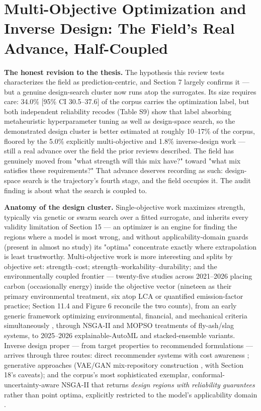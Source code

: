 \documentclass[pdflatex,sn-basic]{sn-jnl}
\begin{document}
\section{Multi-Objective Optimization and Inverse Design: The Field's Real Advance, Half-Coupled}

\textbf{The honest revision to the thesis.} The hypothesis this review tests characterizes the field as prediction-centric, and Section 7 largely confirms it --- but a genuine design-search cluster now runs atop the surrogates. Its size requires care: 34.0\% [95\% CI 30.5--37.6] of the corpus carries the optimization label, but both independent reliability recodes (Table S9) show that label absorbing metaheuristic hyperparameter tuning as well as design-space search, so the demonstrated design cluster is better estimated at roughly 10--17\% of the corpus, floored by the 5.0\% explicitly multi-objective and 1.8\% inverse-design work --- still a real advance over the field the prior reviews described. The field has genuinely moved from "what strength will this mix have?" toward "what mix satisfies these requirements?" That advance deserves recording as such: design-space search is the trajectory's fourth stage, and the field occupies it. The audit finding is about what the search is coupled to.

\textbf{Anatomy of the design cluster.} Single-objective work maximizes strength, typically via genetic or swarm search over a fitted surrogate, and inherits every validity limitation of Section 15 --- an optimizer is an engine for finding the regions where a model is most wrong, and without applicability-domain guards (present in almost no study) its "optima" concentrate exactly where extrapolation is least trustworthy. Multi-objective work is more interesting and splits by objective set: strength--cost; strength--workability--durability; and the environmentally coupled frontier --- twenty-five studies across 2021--2026 placing carbon (occasionally energy) inside the objective vector (nineteen as their primary environmental treatment, six atop LCA or quantified emission-factor practice; Section 11.4 and Figure 6 reconcile the two counts), from an early generic framework optimizing environmental, financial, and mechanical criteria simultaneously \citep{shobeiri2022}, through NSGA-II and MOPSO treatments of fly-ash/slag systems, to 2025--2026 explainable-AutoML and stacked-ensemble variants. Inverse design proper --- from target properties to recommended formulations --- arrives through three routes: direct recommender systems with cost awareness \citep{natarajan2026}; generative approaches (VAE/GAN mix-repository construction \citep{gu2025}, with Section 18's caveats); and the corpus's most sophisticated exemplar, conformal-uncertainty-aware NSGA-II that returns \emph{design regions with reliability guarantees} rather than point optima, explicitly restricted to the model's applicability domain \citep{jagad2026}.
\end{document}
